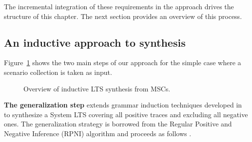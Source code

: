 The incremental integration of these requirements in the approach drives the structure of this chapter. The next section provides an overview of this process.


\subsection{An inductive approach to synthesis\label{subsection:inductive-synthesis-approach}}

Figure~\ref{image:inductive-synthesis-overview} shows the two main steps of our approach for the simple case where a scenario collection is taken as input. 

\begin{figure}\centering
  \caption{Overview of inductive LTS synthesis from MSCs.\label{image:inductive-synthesis-overview}}
\end{figure}

\noindent \textbf{The generalization step} extends grammar induction techniques developed in \cite{Oncina:1992} to synthesize a System LTS covering all positive traces and excluding all negative ones. The generalization strategy is borrowed from the Regular Positive and Negative Inference (RPNI) algorithm and proceeds as follows \cite{Oncina:1992}.


